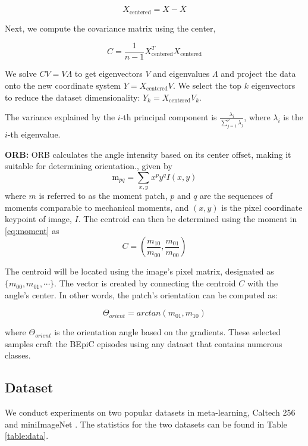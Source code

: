 \begin{equation}
{X}_{\text{centered}} = {X} - \bar{{X}}
\end{equation}

Next, we compute the covariance matrix using the center,

\begin{equation}
 {C} = \frac{1}{n-1} {X}_{\text{centered}}^T {X}_{\text{centered}}
\end{equation}

We solve \( {C} {V} = {V} {\Lambda} \) to get eigenvectors \( {V} \) and eigenvalues \( {\Lambda} \) and project the data onto the new coordinate system \( {Y} = {X}_{\text{centered}} {V} \). We select the top \( k \) eigenvectors to reduce the dataset dimensionality: \( {Y}_k = {X}_{\text{centered}} {V}_k \).

The variance explained by the \( i \)-th principal component is \( \frac{\lambda_i}{\sum_{j=1}^p \lambda_j} \), where \( \lambda_i \) is the \( i \)-th eigenvalue.

\textbf{ORB:} ORB calculates the angle intensity based on its center offset, making it suitable for determining orientation., given by
\begin{equation} \label{eq:moment}
\mathrm{m}_{pq}=\sum_{x,y}{x}^{p}{y}^{q}I(x,y)
\end{equation}
where $m$ is referred to as the moment patch, $p$ and $q$ are the sequences of moments comparable to mechanical moments, and $(x, y)$ is the pixel coordinate keypoint of image, $I$. The centroid can then be determined using the moment in \eqref{eq:moment} as
\begin{equation}
C = \left(\frac{m_{10}}{m_{00}},\frac{m_{01}}{m_{00}} \right)
\end{equation}

The centroid will be located using the image's pixel matrix, designated as $\{m_{00}, m_{01}, \cdots\}$. The vector is created by connecting the centroid $C$ with the angle's center. In other words, the patch's orientation can be computed as:

\begin{equation}
\Theta_{orient}=arctan(m_{01},m_{10})
\end{equation}

where $\Theta_{orient}$ is the orientation angle based on the gradients. These selected samples craft the BEpiC episodes using any dataset that contains numerous classes.

\subsection{Dataset}
We conduct experiments on two popular datasets in meta-learning, Caltech 256 \cite{griffin_holub_perona_2022} and miniImageNet \cite{liu2020embarrassingly}. The statistics for the two datasets can be found in Table \ref{table:data}.

